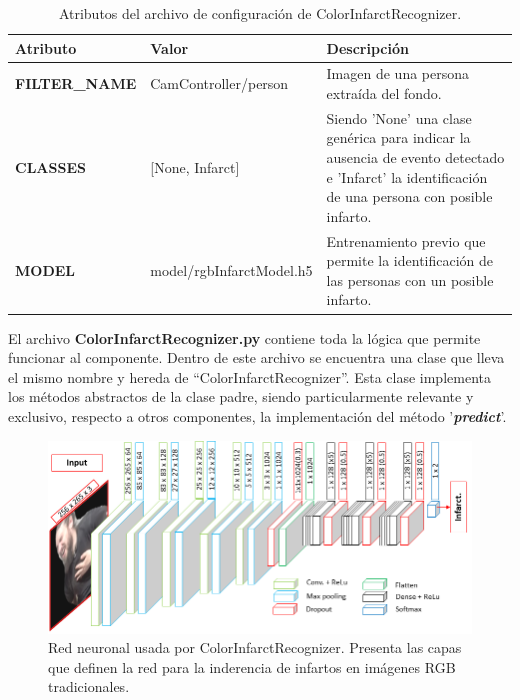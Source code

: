         \begin{table}[ht!]
        \caption[Archivo de configuración de ColorInfarctRecognizer]{Atributos del archivo de configuración de ColorInfarctRecognizer.}
        \label{Tab:ConfigFileInfarctHAR}
        \centering
        \begin{tabular}{ | l l p{6cm} | } 
            \hline
            \textbf{Atributo}       & \textbf{Valor} & \textbf{Descripción} \\ 
            \hline\hline
            \textbf{FILTER\_NAME}   & CamController/person & Imagen de una persona extraída del fondo.\\
            \hline
            \textbf{CLASSES}  & [None, Infarct] & Siendo 'None' una clase genérica para indicar la ausencia de evento detectado e 'Infarct' la identificación de una persona con posible infarto.\\
            \hline
            \textbf{MODEL}        & model/rgbInfarctModel.h5  &  Entrenamiento previo que permite la identificación de las personas con un posible infarto.\\
            \hline
        \end{tabular}
        \end{table}
        
        El archivo \textbf{ColorInfarctRecognizer.py} contiene toda la lógica que permite funcionar al componente. Dentro de este archivo se encuentra una clase que lleva el mismo nombre y hereda de ``ColorInfarctRecognizer''. Esta clase implementa los métodos abstractos de la clase padre, siendo particularmente relevante y exclusivo, respecto a otros componentes, la implementación del método '\textbf{\textit{predict}}'.
        
        \begin{figure}[ht!]
        	\centering
        	\includegraphics[width=0.9\linewidth]{imgs/04-Construction/04-InfarctBasic-Network.png}
        	\caption[Red neuronal usada por ColorInfarctRecognizer]{Red neuronal usada por ColorInfarctRecognizer. Presenta las capas que definen la red para la inderencia de infartos en imágenes RGB tradicionales.}
    	    \label{fig:InfarctBasic-Network}
        \end{figure}%
        
